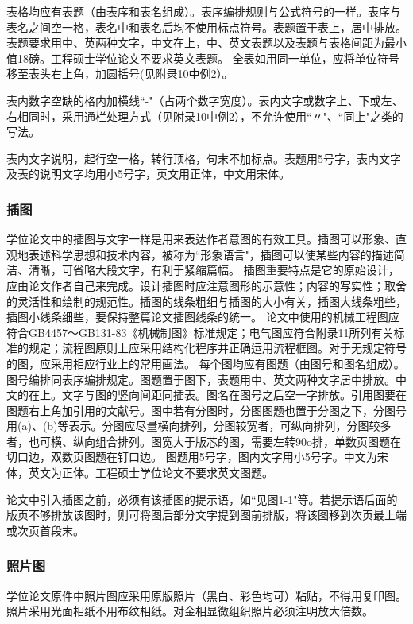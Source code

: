 表格均应有表题（由表序和表名组成）。表序编排规则与公式符号的一样。表序与表名之间空一格，表名中和表名后均不使用标点符号。表题置于表上，居中排放。表题要求用中、英两种文字，中文在上，中、英文表题以及表题与表格间距为最小值18磅。工程硕士学位论文不要求英文表题。
全表如用同一单位，应将单位符号移至表头右上角，加圆括号(见附录10中例2）。

表内数字空缺的格内加横线``-"（占两个数字宽度）。表内文字或数字上、下或左、右相同时，采用通栏处理方式（见附录10中例2），不允许使用``〃"、``同上"之类的写法。

表内文字说明，起行空一格，转行顶格，句末不加标点。表题用5号字，表内文字及表的说明文字均用小5号字，英文用正体，中文用宋体。

\subsubsection{插图}\label{appendixA-6-2-10}
学位论文中的插图与文字一样是用来表达作者意图的有效工具。插图可以形象、直观地表述科学思想和技术内容，被称为``形象语言"，插图可以使某些内容的描述简洁、清晰，可省略大段文字，有利于紧缩篇幅。
插图重要特点是它的原始设计，应由论文作者自己来完成。设计插图时应注意图形的示意性；内容的写实性；取舍的灵活性和绘制的规范性。插图的线条粗细与插图的大小有关，插图大线条粗些，插图小线条细些，要保持整篇论文插图线条的统一。
论文中使用的机械工程图应符合GB4457～GB131-83《机械制图》标准规定；电气图应符合附录11所列有关标准的规定；流程图原则上应采用结构化程序并正确运用流程框图。对于无规定符号的图，应采用相应行业上的常用画法。
每个图均应有图题（由图号和图名组成）。图号编排同表序编排规定。图题置于图下，表题用中、英文两种文字居中排放。中文的在上。文字与图的竖向间距同插表。图名在图号之后空一字排放。引用图要在图题右上角加引用的文献号。图中若有分图时，分图图题也置于分图之下，分图号用(a)、(b)等表示。分图应尽量横向排列，分图较宽者，可纵向排列，分图较多者，也可横、纵向组合排列。图宽大于版芯的图，需要左转90o排，单数页图题在切口边，双数页图题在钉口边。
图题用5号字，图内文字用小5号字。中文为宋体，英文为正体。工程硕士学位论文不要求英文图题。

论文中引入插图之前，必须有该插图的提示语，如``见图1-1"等。若提示语后面的版页不够排放该图时，则可将图后部分文字提到图前排版，将该图移到次页最上端或次页首段末。


\subsubsection{照片图}\label{appendixA-6-2-11}
学位论文原件中照片图应采用原版照片（黑白、彩色均可）粘贴，不得用复印图。照片采用光面相纸不用布纹相纸。对金相显微组织照片必须注明放大倍数。

